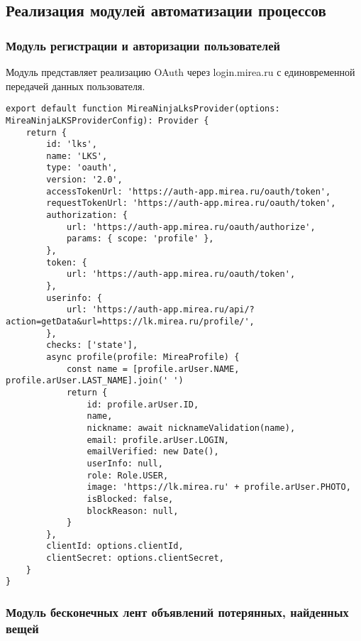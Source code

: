 \subsection{Реализация модулей автоматизации процессов}

\subsubsection{Модуль регистрации и авторизации пользователей}

Модуль представляет реализацию OAuth через login.mirea.ru с единовременной передачей данных пользователя.

\begin{lstlisting}[caption={Реализация OAuth}, label=lst:oauth]
export default function MireaNinjaLksProvider(options: MireaNinjaLKSProviderConfig): Provider {
	return {
		id: 'lks',
		name: 'LKS',
		type: 'oauth',
		version: '2.0',
		accessTokenUrl: 'https://auth-app.mirea.ru/oauth/token',
		requestTokenUrl: 'https://auth-app.mirea.ru/oauth/token',
		authorization: {
			url: 'https://auth-app.mirea.ru/oauth/authorize',
			params: { scope: 'profile' },
		},
		token: {
			url: 'https://auth-app.mirea.ru/oauth/token',
		},
		userinfo: {
			url: 'https://auth-app.mirea.ru/api/?action=getData&url=https://lk.mirea.ru/profile/',
		},
		checks: ['state'],
		async profile(profile: MireaProfile) {
			const name = [profile.arUser.NAME, profile.arUser.LAST_NAME].join(' ')
			return {
				id: profile.arUser.ID,
				name,
				nickname: await nicknameValidation(name),
				email: profile.arUser.LOGIN,
				emailVerified: new Date(),
				userInfo: null,
				role: Role.USER,
				image: 'https://lk.mirea.ru' + profile.arUser.PHOTO,
				isBlocked: false,
				blockReason: null,
			}
		},
		clientId: options.clientId,
		clientSecret: options.clientSecret,
	}
}
\end{lstlisting}


\subsubsection{Модуль бесконечных лент объявлений потерянных, найденных вещей}

